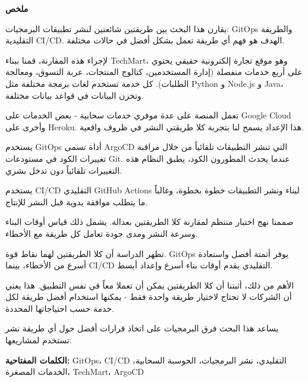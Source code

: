 \thispagestyle{empty}
\vspace*{\fill}

\begin{center}
{\Large \textbf{\textarabic{ملخص}}}
\end{center}

\vspace{1cm}

\begin{otherlanguage}{arabic}
\begin{RTL}
يقارن هذا البحث بين طريقتين شائعتين لنشر تطبيقات البرمجيات: GitOps والطريقة التقليدية CI/CD. الهدف هو فهم أي طريقة تعمل بشكل أفضل في حالات مختلفة.

لإجراء هذه المقارنة، قمنا ببناء TechMart، وهو موقع تجارة إلكترونية حقيقي يحتوي على أربع خدمات منفصلة (إدارة المستخدمين، كتالوج المنتجات، عربة التسوق، ومعالجة الطلبات). كل خدمة تستخدم لغات برمجة مختلفة مثل Python و Node.js و Java، وتخزن البيانات في قواعد بيانات مختلفة.

تعمل المنصة على عدة موفري خدمات سحابية - بعض الخدمات على Google Cloud وأخرى على Heroku. هذا الإعداد يسمح لنا بتجربة كلا طريقتي النشر في ظروف واقعية.

يستخدم GitOps أداة تسمى ArgoCD التي تنشر التطبيقات تلقائياً من خلال مراقبة تغييرات الكود في مستودعات Git. عندما يحدث المطورون الكود، يطبق النظام هذه التغييرات تلقائياً دون تدخل بشري.

يستخدم CI/CD التقليدي GitHub Actions لبناء ونشر التطبيقات خطوة بخطوة، وغالباً ما يتطلب موافقة يدوية قبل النشر للإنتاج.

صممنا نهج اختبار منتظم لمقارنة كلا الطريقتين بعدالة. يشمل ذلك قياس أوقات البناء وسرعة النشر ومدى جودة تعامل كل طريقة مع الأخطاء.

تظهر الدراسة أن كلا الطريقتين لهما نقاط قوة. GitOps يوفر أتمتة أفضل واستعادة أسرع من الأخطاء، بينما CI/CD التقليدي يقدم أوقات بناء أسرع وإعداد أبسط.

الأهم من ذلك، أثبتنا أن كلا الطريقتين يمكن أن تعملا معاً في نفس التطبيق. هذا يعني أن الشركات لا تحتاج لاختيار طريقة واحدة فقط - يمكنها استخدام أفضل طريقة لكل خدمة حسب احتياجاتها المحددة.

يساعد هذا البحث فرق البرمجيات على اتخاذ قرارات أفضل حول أي طريقة نشر تستخدم لمشاريعها.

\textbf{الكلمات المفتاحية:} GitOps، CI/CD التقليدي، نشر البرمجيات، الحوسبة السحابية، الخدمات المصغرة، TechMart، ArgoCD
\end{RTL}
\end{otherlanguage}

\vspace*{\fill}
\newpage